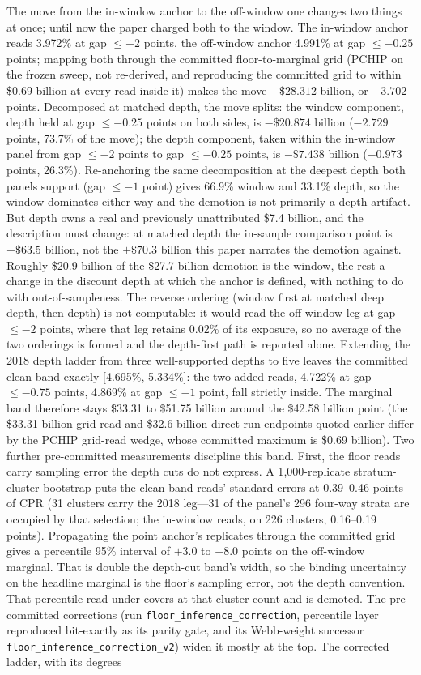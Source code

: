 \documentclass[12pt]{article}
\begin{document}
The move from the in-window anchor to the off-window one changes two things at once; until now the paper charged both to the window. The in-window anchor reads 3.972\% at gap $\leq -2$ points, the off-window anchor 4.991\% at gap $\leq -0.25$ points; mapping both through the committed floor-to-marginal grid (PCHIP on the frozen sweep, not re-derived, and reproducing the committed grid to within \$0.69 billion at every read inside it) makes the move $-\$28.312$ billion, or $-3.702$ points. Decomposed at matched depth, the move splits: the window component, depth held at gap $\leq -0.25$ points on both sides, is $-\$20.874$ billion ($-2.729$ points, 73.7\% of the move); the depth component, taken within the in-window panel from gap $\leq -2$ points to gap $\leq -0.25$ points, is $-\$7.438$ billion ($-0.973$ points, 26.3\%). Re-anchoring the same decomposition at the deepest depth both panels support (gap $\leq -1$ point) gives 66.9\% window and 33.1\% depth, so the window dominates either way and the demotion is not primarily a depth artifact. But depth owns a real and previously unattributed \$7.4 billion, and the description must change: at matched depth the in-sample comparison point is $+\$63.5$ billion, not the $+\$70.3$ billion this paper narrates the demotion against. Roughly \$20.9 billion of the \$27.7 billion demotion is the window, the rest a change in the discount depth at which the anchor is defined, with nothing to do with out-of-sampleness. The reverse ordering (window first at matched deep depth, then depth) is not computable: it would read the off-window leg at gap $\leq -2$ points, where that leg retains 0.02\% of its exposure, so no average of the two orderings is formed and the depth-first path is reported alone. Extending the 2018 depth ladder from three well-supported depths to five leaves the committed clean band exactly [4.695\%, 5.334\%]: the two added reads, 4.722\% at gap $\leq -0.75$ points, 4.869\% at gap $\leq -1$ point, fall strictly inside. The marginal band therefore stays \$33.31 to \$51.75 billion around the \$42.58 billion point (the \$33.31 billion grid-read and \$32.6 billion direct-run endpoints quoted earlier differ by the PCHIP grid-read wedge, whose committed maximum is \$0.69 billion). Two further pre-committed measurements discipline this band. First, the floor reads carry sampling error the depth cuts do not express. A 1{,}000-replicate stratum-cluster bootstrap puts the clean-band reads' standard errors at 0.39--0.46 points of CPR (31 clusters carry the 2018 leg---31 of the panel's 296 four-way strata are occupied by that selection; the in-window reads, on 226 clusters, 0.16--0.19 points). Propagating the point anchor's replicates through the committed grid gives a percentile 95\% interval of $+3.0$ to $+8.0$ points on the off-window marginal. That is double the depth-cut band's width, so the binding uncertainty on the headline marginal is the floor's sampling error, not the depth convention. That percentile read under-covers at that cluster count and is demoted. The pre-committed corrections (run \texttt{floor\_inference\_correction}, percentile layer reproduced bit-exactly as its parity gate, and its Webb-weight successor \texttt{floor\_inference\_correction\_v2}) widen it mostly at the top. The corrected ladder, with its degrees 
\end{document}
